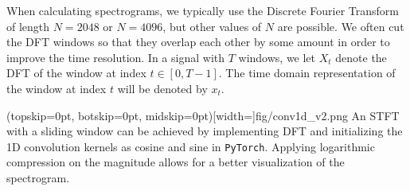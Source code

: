 \documentclass{ieeeaccess}
\newcommand{\nbh}[1]{\texttt{#1}}
\begin{document}
When calculating spectrograms, we typically use the Discrete Fourier Transform of length $N=2048$ or $N=4096$, but other values of $N$ are possible. We often cut the DFT windows so that they overlap each other by some amount in order to improve the time resolution. In a signal with $T$ windows, we let $X_t$ denote the DFT of the window at index $t \in [0,T-1]$. The time domain representation of the window at index $t$ will be denoted by $x_t$. 






\Figure[t!](topskip=0pt, botskip=0pt, midskip=0pt)[width=\linewidth]{fig/conv1d_v2.png}
{An STFT with a sliding window can be achieved by implementing DFT and initializing the 1D convolution kernels as cosine and sine in \nbh{PyTorch}. Applying logarithmic compression on the magnitude allows for a better visualization of the spectrogram. \label{fig: conv1d}}


\end{document}
